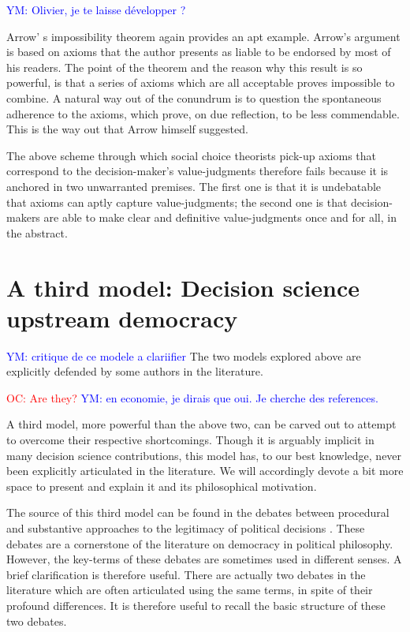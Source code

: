 \documentclass[preprint,11pt]{elsarticle}
\newcommand{\commentYM}[1]{\textcolor{blue}{YM: #1}}
\newcommand{\commentOC}[1]{\textcolor{red}{OC: #1}}
\begin{document}
\commentYM{Olivier, je te laisse développer ?}

Arrow' s  impossibility theorem \cite{arrow_social_2012} again provides an apt example. Arrow's argument is based on axioms that the author presents as liable to be endorsed by most of his readers. The point of the theorem and the reason why this result is so powerful, is that a series of axioms which are all acceptable proves impossible to combine. A natural way out of the conundrum is to question the spontaneous adherence to the axioms, which prove, on due reflection, to be less commendable. This is the way out that Arrow himself suggested.


The above scheme through which social choice theorists pick-up axioms that correspond to the decision-maker's value-judgments therefore fails because it is anchored in two unwarranted premises. The first one is that it is undebatable that axioms can aptly capture value-judgments; the second one is that decision-makers are able to make clear and definitive value-judgments once and for all, in the abstract.

\section{A third model: Decision science upstream democracy}
\commentYM{critique de ce modele a clariifier}
\noindent The two models explored above are explicitly defended by some authors in the literature. 

\commentOC{ Are they?}
\commentYM{en economie, je dirais que oui. Je cherche des references.} 

A third model, more powerful than the above two, can be carved out to attempt to overcome their respective shortcomings. Though it is arguably implicit in many decision science contributions, this model has, to our best knowledge, never been explicitly articulated in the literature. We will accordingly devote a bit more space to present and explain it and its philosophical motivation.

The source of this third model can be found in the debates between procedural and substantive approaches to the legitimacy of political decisions \cite{meinard_what_2017}. These debates are a cornerstone of the literature on democracy in political philosophy. However, the key-terms of these debates are sometimes used in different senses. A brief clarification is therefore useful. There are actually two debates in the literature which are often articulated using the same terms, in spite of their profound differences. It is therefore useful to recall the basic structure of these two debates.
\end{document}

